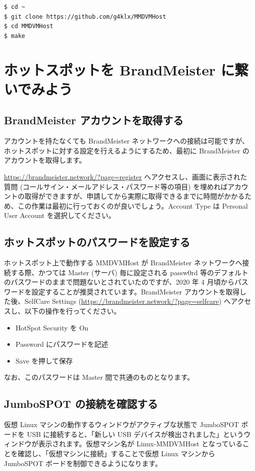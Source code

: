 \documentclass[a4j,oneside]{ujbook}
\begin{document}
\begin{verbatim}
$ cd ~
$ git clone https://github.com/g4klx/MMDVMHost
$ cd MMDVMHost
$ make
\end{verbatim}

\chapter{ホットスポットを BrandMeister に繋いでみよう}

\section{BrandMeister アカウントを取得する}
アカウントを持たなくても BrandMeister ネットワークへの接続は可能ですが、ホットスポットに対する設定を行えるようにするため、最初に BrandMeister のアカウントを取得します。

\url{https://brandmeister.network/?page=register} へアクセスし、画面に表示された質問 (コールサイン・メールアドレス・パスワード等の項目) を埋めればアカウントの取得ができますが、申請してから実際に取得できるまでに時間がかかるため、この作業は最初に行っておくのが良いでしょう。Account Type は Personal User Account を選択してください。

\section{ホットスポットのパスワードを設定する}

ホットスポット上で動作する MMDVMHost が BrandMeister ネットワークへ接続する際、かつては Master (サーバ) 毎に設定される passw0rd 等のデフォルトのパスワードのままで問題ないとされていたのですが、2020 年 4 月頃からパスワードを設定することが推奨されています。BrandMeister アカウントを取得した後、SelfCare Settings (\url{https://brandmeister.network/?page=selfcare}) へアクセスし、以下の操作を行ってください。
\begin{itemize}
 \item HotSpot Security を On
 \item Password にパスワードを記述
 \item Save を押して保存
\end{itemize}
なお、このパスワードは Master 間で共通のものとなります。

\section{JumboSPOT の接続を確認する}

仮想 Linux マシンの動作するウィンドウがアクティブな状態で JumboSPOT ボードを USB に接続すると、「新しい USB デバイスが検出されました」というウィンドウが表示されます。仮想マシン名が Linux-MMDVMHost となっていることを確認し、「仮想マシンに接続」することで仮想 Linux マシンから JumboSPOT ボードを制御できるようになります。
\end{document}
